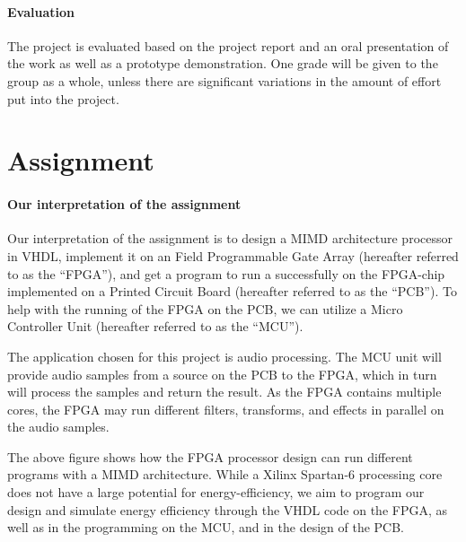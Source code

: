 \paragraph{Evaluation}
The project is evaluated based on the project report and an oral presentation of
the work as well as a prototype demonstration. One grade will be given to the
group as a whole, unless there are significant variations in the amount of
effort put into the project.

\section{Assignment}\label{intro:our-assignment-interpretation}

\paragraph{Our interpretation of the assignment}
Our interpretation of the assignment is to design a MIMD architecture processor
in VHDL, implement it on an Field Programmable Gate Array (hereafter referred to
as the ``FPGA''), and get a program to run a successfully on the FPGA-chip
implemented on a Printed Circuit Board (hereafter referred to as the ``PCB'').
To help with the running of the FPGA on the PCB, we can utilize a
Micro Controller Unit (hereafter referred to as the ``MCU'').


The application chosen for this project is audio processing. The MCU unit will
provide audio samples from a source on the PCB to the FPGA, which in turn will
process the samples and return the result. As the FPGA contains multiple cores,
the FPGA may run different filters, transforms, and effects in parallel on the
audio samples.

The above figure shows how the FPGA processor
design can run different programs with a MIMD architecture. While a Xilinx
Spartan-6\cite{fpga-chip} processing core does not have a large potential for
energy-efficiency, we aim to program our design and simulate energy efficiency
through the VHDL code on the FPGA, as well as in the programming on the MCU, and
in the design of the PCB.

